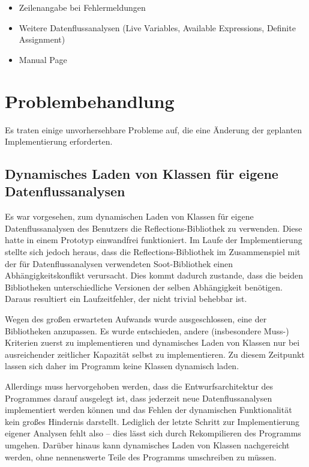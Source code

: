 \begin{itemize}
  \item Zeilenangabe bei Fehlermeldungen
  \item Weitere Datenflussanalysen (Live Variables, Available Expressions, Definite Assignment)
  \item Manual Page
\end{itemize}

\newpage
\section{Problembehandlung}

Es traten einige unvorhersehbare Probleme auf, die eine Änderung der geplanten Implementierung erforderten.

\subsection{Dynamisches Laden von Klassen für eigene Datenflussanalysen}

Es war vorgesehen, zum dynamischen Laden von Klassen für eigene Datenflussanalysen des Benutzers die Reflections-Bibliothek zu verwenden.
Diese hatte in einem Prototyp einwandfrei funktioniert.
Im Laufe der Implementierung stellte sich jedoch heraus, dass die Reflections-Bibliothek im Zusammenspiel mit der für Datenflussanalysen verwendeten Soot-Bibliothek einen Abhängigkeitskonflikt verursacht.
Dies kommt dadurch zustande, dass die beiden Bibliotheken unterschiedliche Versionen der selben Abhängigkeit benötigen. 
Daraus resultiert ein Laufzeitfehler, der nicht trivial behebbar ist.

Wegen des großen erwarteten Aufwands wurde ausgeschlossen, eine der Bibliotheken anzupassen. 
Es wurde entschieden, andere (insbesondere Muss-) Kriterien zuerst zu implementieren und dynamisches Laden von Klassen nur bei ausreichender zeitlicher Kapazität selbst zu implementieren.
Zu diesem Zeitpunkt lassen sich daher im Programm keine Klassen dynamisch laden.

Allerdings muss hervorgehoben werden, dass die Entwurfsarchitektur des Programmes darauf ausgelegt ist, dass jederzeit neue Datenflussanalysen implementiert werden können und das Fehlen der dynamischen Funktionalität kein großes Hindernis darstellt.
Lediglich der letzte Schritt zur Implementierung eigener Analysen fehlt also – dies lässt sich durch Rekompilieren des Programms umgehen.
Darüber hinaus kann dynamisches Laden von Klassen nachgereicht werden, ohne nennenswerte Teile des Programms umschreiben zu müssen.

